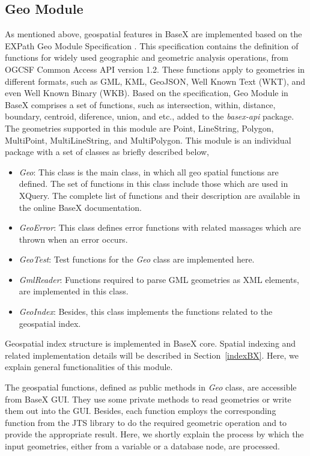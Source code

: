 \documentclass[a4paper,12pt]{article}
\begin{document}
\subsection{Geo Module}
\label{geomodule}
As mentioned above, geospatial features in BaseX are implemented based on the EXPath Geo Module Specification \cite{expath}. This specification contains the definition of functions for widely used geographic and geometric analysis operations, from OGCSF Common Access API version 1.2. These functions apply to geometries in different formats, such as GML, KML, GeoJSON, Well Known Text (WKT), and even Well Known Binary (WKB). Based on the specification, Geo Module in BaseX comprises a set of functions, such as intersection, within, distance, boundary, centroid, diference, union, and etc., added to the \textit{basex-api} package. The geometries supported in this module are Point, LineString, Polygon, MultiPoint, MultiLineString, and MultiPolygon. This module is an individual package with a set of classes as briefly described below,
\begin{itemize}
\item \textit{Geo}: This class is the main class, in which all geo spatial functions are defined. The set of functions in this class include those which are used in XQuery. The complete list of functions and their description are available in the online BaseX documentation.
\item \textit{GeoError}: This class defines error functions with related massages which are thrown when an error occurs.
\item \textit{GeoTest}: Test functions for the \textit{Geo} class are implemented here.
\item \textit{GmlReader}: Functions required to parse GML geometries as XML elements, are implemented in this class.
\item \textit{GeoIndex}: Besides, this class implements the functions related to the geospatial index. 
\end{itemize}

Geospatial index structure is implemented in BaseX core. Spatial indexing and related implementation details will be described in Section~\ref{indexBX}. Here, we explain general functionalities of this module.

The geospatial functions, defined as public methods in \textit{Geo} class, are accessible from BaseX GUI. They use some private methods to read geometries or write them out into the GUI. Besides, each function employs the corresponding function from the JTS library to do the required geometric operation and to provide the appropriate result. Here, we shortly explain the process by which the input geometries, either from a variable or a database node, are processed.
\end{document}
